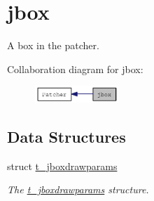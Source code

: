 \hypertarget{group__jbox}{
\section{jbox}
\label{group__jbox}
}


A box in the patcher.  


Collaboration diagram for jbox:\nopagebreak
\begin{figure}[H]
\begin{center}
\leavevmode
\includegraphics[width=89pt]{group__jbox}
\end{center}
\end{figure}
\subsection*{Data Structures}
\begin{DoxyCompactItemize}
\item 
struct \hyperlink{structt__jboxdrawparams}{t\_\-jboxdrawparams}
\begin{DoxyCompactList}\small\item\em The \hyperlink{structt__jboxdrawparams}{t\_\-jboxdrawparams} structure. \item\end{DoxyCompactList}\end{DoxyCompactItemize}
